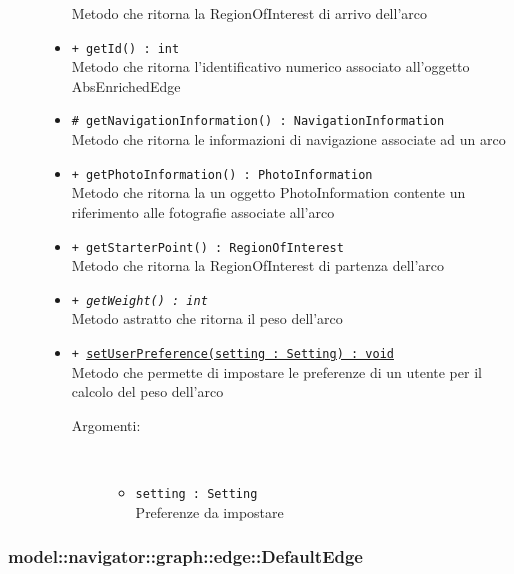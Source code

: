 \documentclass[../DefinizioneDiProdotto.tex]{subfiles}
\begin{document}
\begin{description}
\begin{itemize}
Metodo che ritorna la RegionOfInterest di arrivo dell'arco
 \item \texttt{+ getId() : int}\\
Metodo che ritorna l'identificativo numerico associato all'oggetto AbsEnrichedEdge
 \item \texttt{\# getNavigationInformation() : NavigationInformation}\\
Metodo che ritorna le informazioni di navigazione associate ad un arco
 \item \texttt{+ getPhotoInformation() : PhotoInformation}\\
Metodo che ritorna la un oggetto PhotoInformation contente un riferimento alle fotografie associate all'arco
 \item \texttt{+ getStarterPoint() : RegionOfInterest}\\
Metodo che ritorna la RegionOfInterest di partenza dell'arco
 \item \texttt{+ \textit{getWeight() : int}}\\
Metodo astratto che ritorna il peso dell'arco
 \item \texttt{+ \underline{setUserPreference(setting : Setting) : void}}\\
Metodo che permette di impostare le preferenze di un utente per il calcolo del peso dell'arco
 \begin{description}
\item[Argomenti:] \
\begin{itemize}
\item \texttt{setting : Setting}\\
Preferenze da impostare\end{itemize}
\end{description}
\end{itemize}
\end{description}

\subsubsection{model::navigator::graph::edge::DefaultEdge}
\end{document}
